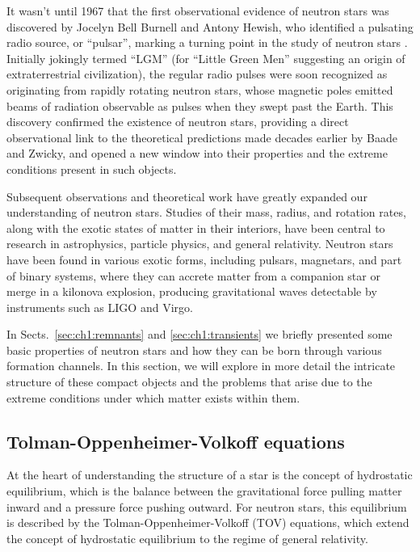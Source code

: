 \documentclass[main.tex]{subfiles}
\begin{document}
    It wasn't until 1967 that the first observational evidence of neutron stars was discovered by Jocelyn Bell Burnell and Antony Hewish, who identified a pulsating radio source, or ``pulsar'', marking a turning point in the study of neutron stars \citep{1968Natur.217..709H}. Initially jokingly termed ``LGM'' (for ``Little Green Men'' suggesting an origin of extraterrestrial civilization), the regular radio pulses were soon recognized as originating from rapidly rotating neutron stars, whose magnetic poles emitted beams of radiation observable as pulses when they swept past the Earth. This discovery confirmed the existence of neutron stars, providing a direct observational link to the theoretical predictions made decades earlier by Baade and Zwicky, and opened a new window into their properties and the extreme conditions present in such objects.

    Subsequent observations and theoretical work have greatly expanded our understanding of neutron stars. Studies of their mass, radius, and rotation rates, along with the exotic states of matter in their interiors, have been central to research in astrophysics, particle physics, and general relativity. Neutron stars have been found in various exotic forms, including pulsars, magnetars, and part of binary systems, where they can accrete matter from a companion star or merge in a kilonova explosion, producing gravitational waves detectable by instruments such as LIGO and Virgo.

    In Sects.~\ref{sec:ch1:remnants} and \ref{sec:ch1:transients} we briefly presented some basic properties of neutron stars and how they can be born through various formation channels. In this section, we will explore in more detail the intricate structure of these compact objects and the problems that arise due to the extreme conditions under which matter exists within them.

    \subsection{Tolman-Oppenheimer-Volkoff equations}
    At the heart of understanding the structure of a star is the concept of hydrostatic equilibrium, which is the balance between the gravitational force pulling matter inward and a pressure force pushing outward. For neutron stars, this equilibrium is described by the Tolman-Oppenheimer-Volkoff (TOV) equations, which extend the concept of hydrostatic equilibrium to the regime of general relativity.
\end{document}
